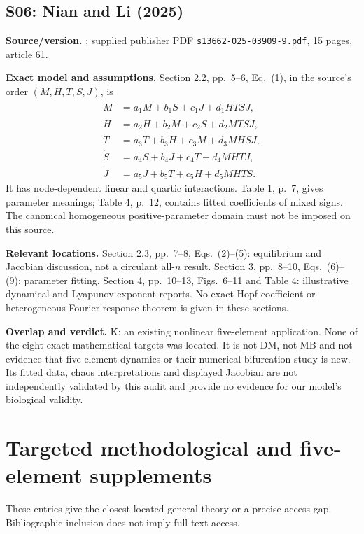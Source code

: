 \subsection{S06: Nian and Li (2025)}
\label{src:nian}
\textbf{Source/version.} \cite{NianLi2025}; supplied publisher PDF
\texttt{s13662-025-03909-9.pdf}, 15 pages, article 61.

\textbf{Exact model and assumptions.} Section 2.2, pp.~5--6,
Eq.~(1), in the source's order $(M,H,T,S,J)$, is
\[
\begin{aligned}
 \dot M&=a_1M+b_1S+c_1J+d_1HTSJ,\\
 \dot H&=a_2H+b_2M+c_2S+d_2MTSJ,\\
 \dot T&=a_3T+b_3H+c_3M+d_3MHSJ,\\
 \dot S&=a_4S+b_4J+c_4T+d_4MHTJ,\\
 \dot J&=a_5J+b_5T+c_5H+d_5MHTS.
\end{aligned}
\]
It has node-dependent linear and quartic interactions. Table 1, p.~7,
gives parameter meanings; Table 4, p.~12, contains fitted coefficients
of mixed signs. The canonical homogeneous positive-parameter domain
must not be imposed on this source.

\textbf{Relevant locations.} Section 2.3, pp.~7--8, Eqs.~(2)--(5):
equilibrium and Jacobian discussion, not a circulant all-$n$ result.
Section 3, pp.~8--10, Eqs.~(6)--(9): parameter fitting.
Section 4, pp.~10--13, Figs.~6--11 and Table 4: illustrative dynamical
and Lyapunov-exponent reports. No exact Hopf coefficient or
heterogeneous Fourier response theorem is given in these sections.

\textbf{Overlap and verdict.} K: an existing nonlinear five-element
application. None of the eight exact mathematical targets was located.
It is not DM, not MB and not evidence that five-element dynamics or
their numerical bifurcation study is new. Its fitted data, chaos
interpretations and displayed Jacobian are not independently validated
by this audit and provide no evidence for our model's biological validity.

\section{Targeted methodological and five-element supplements}
\label{sec:supplemental-sources}
These entries give the closest located general theory or a precise
access gap. Bibliographic inclusion does not imply full-text access.

